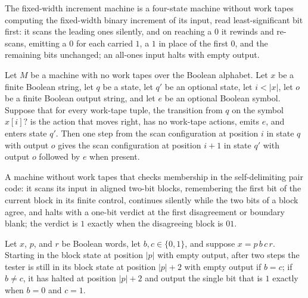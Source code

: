 \begin{definition}
\label{Turing.FinTM.incFixedTM}
\leanok
{}
The fixed-width increment machine is a four-state machine without work
tapes computing the fixed-width binary increment of its input, read
least-significant bit first: it scans the leading ones silently, and on
reaching a $0$ it rewinds and re-scans, emitting a $0$ for each carried $1$,
a $1$ in place of the first $0$, and the remaining bits unchanged; an
all-ones input halts with empty output.
\end{definition}

\begin{lemma}
\label{Turing.FinTM.scanStep_right}
\leanok
{}
Let $M$ be a machine with no work tapes over the Boolean alphabet. Let $x$ be a finite
Boolean string, let $q$ be a state, let $q'$ be an optional state, let $i<|x|$, let $o$
be a finite Boolean output string, and let $e$ be an optional Boolean symbol. Suppose
that for every work-tape tuple, the transition from $q$ on the symbol $x[i]?$ is the
action that moves right, has no work-tape actions, emits $e$, and enters state $q'$.
Then one step from the scan configuration at position $i$ in state $q$ with output $o$
gives the scan configuration at position $i+1$ in state $q'$ with output $o$ followed by
$e$ when present.
\end{lemma}

\begin{definition}
\label{Turing.FinTM.pairValidTM}
\leanok
{}
A machine without work tapes that checks membership in the self-delimiting
pair code: it scans its input in aligned two-bit blocks, remembering the first
bit of the current block in its finite control, continues silently while the
two bits of a block agree, and halts with a one-bit verdict at the first
disagreement or boundary blank; the verdict is $1$ exactly when the
disagreeing block is $01$.
\end{definition}

\begin{lemma}
\label{Turing.FinTM.pairValid_block}
\leanok
{}
Let $x$, $p$, and $r$ be Boolean words, let $b,c\in\{0,1\}$, and suppose $x=p\,b\,c\,r$.
Starting in the block state at position $|p|$ with empty output, after two steps the
tester is still in its block state at position $|p|+2$ with empty output if $b=c$; if
$b\ne c$, it has halted at position $|p|+2$ and output the single bit that is $1$
exactly when $b=0$ and $c=1$.
\end{lemma}

